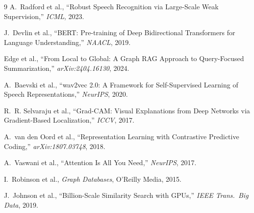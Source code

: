 \documentclass[12pt,a4paper]{article}
\begin{document}
\vspace{0.5cm}
\begin{thebibliography}{9}
  A.~Radford et al., ``Robust Speech Recognition via Large-Scale Weak Supervision,''
  \emph{ICML}, 2023.

  J.~Devlin et al., ``BERT: Pre-training of Deep Bidirectional Transformers
  for Language Understanding,'' \emph{NAACL}, 2019.

  Edge et al., ``From Local to Global: A Graph RAG Approach to Query-Focused
  Summarization,'' \emph{arXiv:2404.16130}, 2024.

  A.~Baevski et al., ``wav2vec 2.0: A Framework for Self-Supervised Learning
  of Speech Representations,'' \emph{NeurIPS}, 2020.

  R.~R. Selvaraju et al., ``Grad-CAM: Visual Explanations from Deep Networks
  via Gradient-Based Localization,'' \emph{ICCV}, 2017.

  A.~van den Oord et al., ``Representation Learning with Contrastive Predictive
  Coding,'' \emph{arXiv:1807.03748}, 2018.

  A.~Vaswani et al., ``Attention Is All You Need,'' \emph{NeurIPS}, 2017.

  I.~Robinson et al., \emph{Graph Databases}, O'Reilly Media, 2015.

  J.~Johnson et al., ``Billion-Scale Similarity Search with GPUs,''
  \emph{IEEE Trans.\ Big Data}, 2019.
\end{thebibliography}
\end{document}
